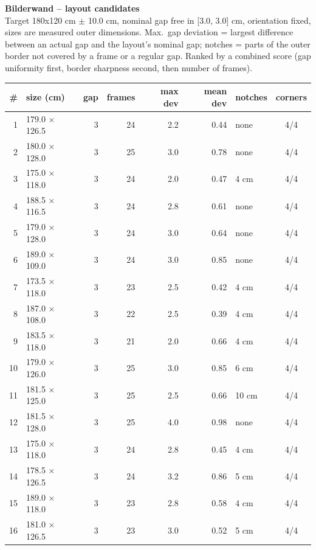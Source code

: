 \documentclass[a4paper,landscape,10pt]{article}
\begin{document}
{\LARGE\bfseries Bilderwand -- layout candidates}\\[4pt]
{\small Target 180x120 cm $\pm$ 10.0 cm, nominal gap free in
[3.0, 3.0] cm, orientation fixed, sizes are measured outer dimensions.
Max.\ gap deviation = largest difference between an actual gap and the layout's nominal gap;
notches = parts of the outer border not covered by a frame or a regular gap. Ranked by a combined
score (gap uniformity first, border sharpness second, then number of frames).}\\[10pt]
\begin{minipage}[t]{0.6\textwidth}\vspace{0pt}
\begin{tabular}{@{}r l r r r r l c@{}}
\toprule
\# & size (cm) & gap & frames & max dev & mean dev & notches & corners \\
\midrule
1 & 179.0 $\times$ 126.5 & 3 & 24 & 2.2 & 0.44 & none & 4/4 \\
2 & 180.0 $\times$ 128.0 & 3 & 25 & 3.0 & 0.78 & none & 4/4 \\
3 & 175.0 $\times$ 118.0 & 3 & 24 & 2.0 & 0.47 & 4 cm & 4/4 \\
4 & 188.5 $\times$ 116.5 & 3 & 24 & 2.8 & 0.61 & none & 4/4 \\
5 & 179.0 $\times$ 128.0 & 3 & 24 & 3.0 & 0.64 & none & 4/4 \\
6 & 189.0 $\times$ 109.0 & 3 & 24 & 3.0 & 0.85 & none & 4/4 \\
7 & 173.5 $\times$ 118.0 & 3 & 23 & 2.5 & 0.42 & 4 cm & 4/4 \\
8 & 187.0 $\times$ 108.0 & 3 & 22 & 2.5 & 0.39 & 4 cm & 4/4 \\
9 & 183.5 $\times$ 118.0 & 3 & 21 & 2.0 & 0.66 & 4 cm & 4/4 \\
10 & 179.0 $\times$ 126.0 & 3 & 25 & 3.0 & 0.85 & 6 cm & 4/4 \\
11 & 181.5 $\times$ 125.0 & 3 & 25 & 2.5 & 0.66 & 10 cm & 4/4 \\
12 & 181.5 $\times$ 128.0 & 3 & 25 & 4.0 & 0.98 & none & 4/4 \\
13 & 175.0 $\times$ 118.0 & 3 & 24 & 2.8 & 0.45 & 4 cm & 4/4 \\
14 & 178.5 $\times$ 126.5 & 3 & 24 & 3.2 & 0.86 & 5 cm & 4/4 \\
15 & 189.0 $\times$ 118.0 & 3 & 23 & 2.8 & 0.58 & 4 cm & 4/4 \\
16 & 181.0 $\times$ 126.5 & 3 & 23 & 3.0 & 0.52 & 5 cm & 4/4 \\
\bottomrule
\end{tabular}
\end{minipage}\hfill
\end{document}
